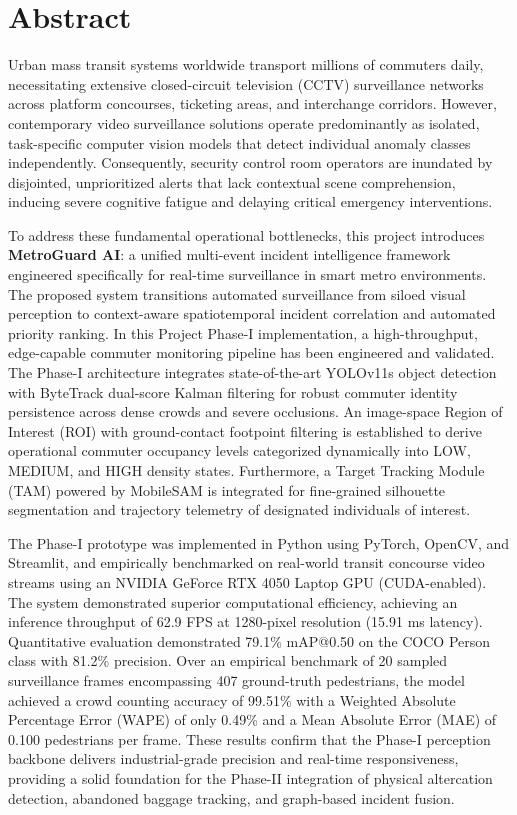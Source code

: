 \chapter*{Abstract}%
%

Urban mass transit systems worldwide transport millions of commuters daily, necessitating extensive closed-circuit television (CCTV) surveillance networks across platform concourses, ticketing areas, and interchange corridors. However, contemporary video surveillance solutions operate predominantly as isolated, task-specific computer vision models that detect individual anomaly classes independently. Consequently, security control room operators are inundated by disjointed, unprioritized alerts that lack contextual scene comprehension, inducing severe cognitive fatigue and delaying critical emergency interventions.

To address these fundamental operational bottlenecks, this project introduces \textbf{MetroGuard AI}: a unified multi-event incident intelligence framework engineered specifically for real-time surveillance in smart metro environments. The proposed system transitions automated surveillance from siloed visual perception to context-aware spatiotemporal incident correlation and automated priority ranking. In this Project Phase-I implementation, a high-throughput, edge-capable commuter monitoring pipeline has been engineered and validated. The Phase-I architecture integrates state-of-the-art YOLOv11s object detection with ByteTrack dual-score Kalman filtering for robust commuter identity persistence across dense crowds and severe occlusions. An image-space Region of Interest (ROI) with ground-contact footpoint filtering is established to derive operational commuter occupancy levels categorized dynamically into LOW, MEDIUM, and HIGH density states. Furthermore, a Target Tracking Module (TAM) powered by MobileSAM is integrated for fine-grained silhouette segmentation and trajectory telemetry of designated individuals of interest.

The Phase-I prototype was implemented in Python using PyTorch, OpenCV, and Streamlit, and empirically benchmarked on real-world transit concourse video streams using an NVIDIA GeForce RTX 4050 Laptop GPU (CUDA-enabled). The system demonstrated superior computational efficiency, achieving an inference throughput of 62.9 FPS at 1280-pixel resolution (15.91 ms latency). Quantitative evaluation demonstrated 79.1\% mAP@0.50 on the COCO Person class with 81.2\% precision. Over an empirical benchmark of 20 sampled surveillance frames encompassing 407 ground-truth pedestrians, the model achieved a crowd counting accuracy of 99.51\% with a Weighted Absolute Percentage Error (WAPE) of only 0.49\% and a Mean Absolute Error (MAE) of 0.100 pedestrians per frame. These results confirm that the Phase-I perception backbone delivers industrial-grade precision and real-time responsiveness, providing a solid foundation for the Phase-II integration of physical altercation detection, abandoned baggage tracking, and graph-based incident fusion.

\thispagestyle{plain}
